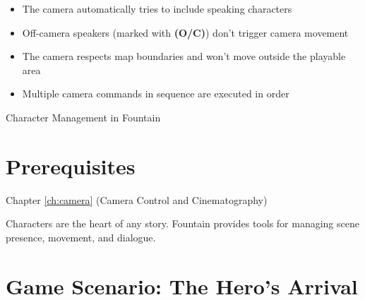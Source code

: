 \documentclass[11pt,letterpaper,oldstylefigures]{memoir}
\makeatletter
\let\oldchapter\chapter
\def\chapter{%
  \@ifstar
    {\FountainScripting@starchapter}%
    {\@dblarg\FountainScripting@chapter}}
\def\FountainScripting@starchapter#1{\oldchapter*{#1}\chaptermark{#1}}
\def\FountainScripting@chapter[#1]#2{\oldchapter[#1]{#2}\chaptermark{#2}}
\newcommand{\sectionbreak}{\newpage}
\newcommand{\fountain}[1]{\textbf{#1}}
\makeatother
\begin{document}
\begin{itemize}
\item The camera automatically tries to include speaking characters
\item Off-camera speakers (marked with \fountain{(O/C)}) don't trigger camera movement
\item The camera respects map boundaries and won't move outside the playable area
\item Multiple camera commands in sequence are executed in order
\end{itemize}

\chapter{Character Management in Fountain}
\label{ch:characters}
\sectionbreak

\section{Prerequisites}
Chapter \ref{ch:camera} (Camera Control and Cinematography)

Characters are the heart of any story. Fountain provides tools for managing scene presence, movement, and dialogue.

\section{Game Scenario: The Hero's Arrival}
\end{document}
